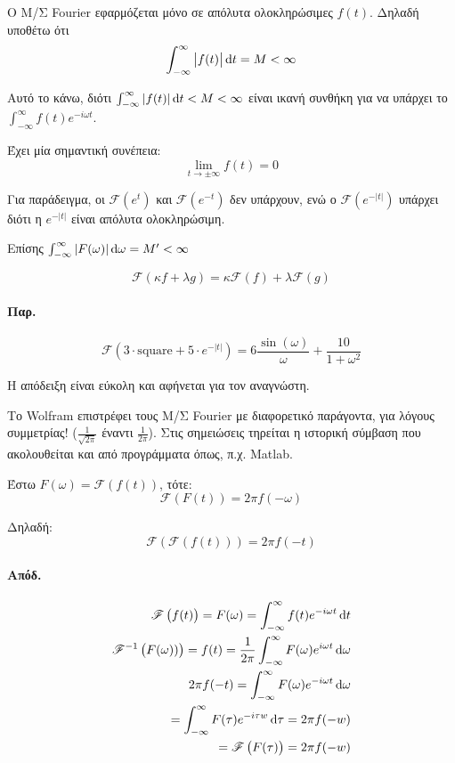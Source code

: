 \documentclass[11pt,a4paper,titlepage,draft]{article}
\begin{document}
\begin{tcolorbox}
Ο Μ/Σ \textlatin{Fourier} εφαρμόζεται μόνο σε απόλυτα ολοκληρώσιμες \(f(t)\). Δηλαδή υποθέτω ότι \[
\int_{- \infty }^ \infty 
\left|
f(t)
\right|
\dif t = M <  \infty 
\]

Αυτό το κάνω, διότι \(\int_{- \infty }^ \infty |f(t)| \dif t < M < \infty\) είναι ικανή συνθήκη για να υπάρχει το \(\int_{- \infty }^ \infty f(t)e^{-i\omega t}\).

Έχει μία σημαντική συνέπεια:
\[
\lim_{t\to\pm\infty} f(t) = 0
\]

Για παράδειγμα, οι \(\mathscr{F}(e^t)\) και \(\mathscr{F}(e^{-t})\) δεν υπάρχουν, ενώ ο \(\mathscr{F}(e^{-|t|})\) υπάρχει διότι η \(e^{-|t|}\) είναι απόλυτα ολοκληρώσιμη.

Επίσης \( \int_{-\infty}^ \infty |F(\omega)| \dif \omega = M' < \infty \)
\end{tcolorbox}

\begin{theorem}{}{}
\[
\mathscr{F}(\kappa f + \lambda g) = \kappa \mathscr{F}(f)+\lambda \mathscr{F}(g)
\]
\tcblower
\paragraph{Παρ.}
\[
 \mathscr{F} (3\cdot \mathrm{square} + 5\cdot e^{-|t|}) = 6 \frac{\sin(\omega)}{\omega}+\frac{10}{1+\omega^2}
\]
\end{theorem}
Η απόδειξη είναι εύκολη και αφήνεται για τον αναγνώστη.

\begin{attnbox}{}
Το \textlatin{Wolfram} επιστρέφει τους Μ/Σ \textlatin{Fourier} με διαφορετικό παράγοντα, για λόγους συμμετρίας! (\(\frac{1}{\sqrt{2\pi}}\) έναντι \(\frac{1}{2\pi}\)). Στις σημειώσεις τηρείται η ιστορική σύμβαση που ακολουθείται και από προγράμματα όπως, π.χ. \textlatin{Matlab}.
\end{attnbox}

\begin{theorem}{}{}
Έστω \(F( \omega )= \mathscr{F} \left( f(t) \right)\), τότε:
\[
 \mathscr{F} \left( F(t) \right) = 2\pi f(-\omega)
\]

Δηλαδή:
\[
 \mathscr{F} \left(  \mathscr{F} \left( f(t) \right) \right) = 2\pi f(-t)
\]
\end{theorem}
\paragraph{Απόδ.}
\begin{align*}
 \mathscr{F} \left( f(t) \right) = F(\omega) = \int_{-\infty}^\infty f(t)e^{-i\omega t} \dif t \\
 \mathscr{F}^{-1} \left( F(\omega)) \right) = f(t) = \frac{1}{2\pi}\int_{-\infty}^\infty F(\omega)e^{i\omega t} \dif \omega \\
 2\pi f(-t) = \int_{-\infty}^ \infty F(\omega) e^{-i\omega t} \dif \omega
 \\
= \int_{-\infty}^ \infty F(\tau)e^{-i\tau w} \dif \tau = 2\pi f(-w) \\
=  \mathscr{F} \left( F(\tau) \right) =2\pi f(-w)
\end{align*}
\end{document}

